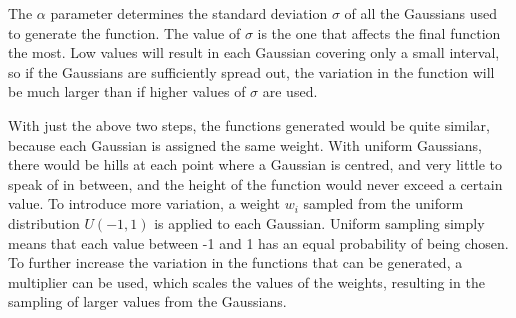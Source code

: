 \documentclass[a4paper,11pt]{article}
\begin{document}
   The $\alpha$ parameter determines the standard deviation $\sigma$ of all the Gaussians
   used to generate the function. The value of $\sigma$ is the one that affects the
   final function the most. Low values will result in each Gaussian covering only a
   small interval, so if the Gaussians are sufficiently spread out, the variation
   in the function will be much larger than if higher values of $\sigma$ are used.

   With just the above two steps, the functions generated would be quite
   similar, because each Gaussian is assigned the same weight. With uniform
   Gaussians, there would be hills at each point where a Gaussian is centred,
   and very little to speak of in between, and the height of the function would
   never exceed a certain value. To introduce more variation, a weight $w_i$
   sampled from the uniform distribution $U(-1,1)$ is applied to each
   Gaussian. Uniform sampling simply means that each value between -1 and 1 has
   an equal probability of being chosen. To further increase the variation in
   the functions that can be generated, a multiplier can be used, which scales
   the values of the weights, resulting in the sampling of larger values from
   the Gaussians.
\end{document}
